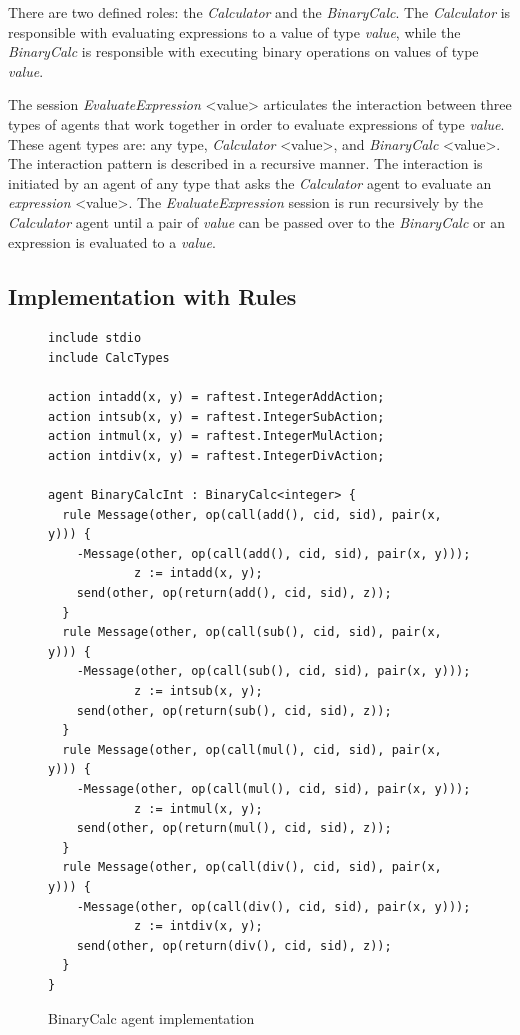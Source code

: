 \documentclass[a4paper,12pt,oneside,fleqn]{book} %
\begin{document}
{There are two defined roles: the \textit{Calculator} and the
\textit{BinaryCalc}. The \textit{Calculator} is responsible with evaluating
expressions to a value of type \textit{value}, while the
\textit{BinaryCalc} is responsible with executing binary operations on
values of type \textit{value}.

The session \textit{EvaluateExpression} <value> articulates the interaction
between three types of agents that work together in order to evaluate
expressions of type \textit{value}. These agent types are: any type,
\textit{Calculator} <value>, and \textit{BinaryCalc} <value>. The
interaction pattern is described in a recursive manner. The interaction is
initiated by an agent of any type that asks the \textit{Calculator} agent
to evaluate an \textit{expression} <value>. The \textit{EvaluateExpression}
session is run recursively by the \textit{Calculator} agent until a pair of
\textit{value} can be passed over to the \textit{BinaryCalc} or an
expression is evaluated to a \textit{value}.
\subsection{Implementation with Rules} %
\begin{figure}\footnotesize %
\begin{verbatim}
include stdio
include CalcTypes

action intadd(x, y) = raftest.IntegerAddAction;
action intsub(x, y) = raftest.IntegerSubAction;
action intmul(x, y) = raftest.IntegerMulAction;
action intdiv(x, y) = raftest.IntegerDivAction;

agent BinaryCalcInt : BinaryCalc<integer> {
  rule Message(other, op(call(add(), cid, sid), pair(x, y))) {
    -Message(other, op(call(add(), cid, sid), pair(x, y)));
            z := intadd(x, y);
    send(other, op(return(add(), cid, sid), z));
  }
  rule Message(other, op(call(sub(), cid, sid), pair(x, y))) {
    -Message(other, op(call(sub(), cid, sid), pair(x, y)));
            z := intsub(x, y);
    send(other, op(return(sub(), cid, sid), z));
  }
  rule Message(other, op(call(mul(), cid, sid), pair(x, y))) {
    -Message(other, op(call(mul(), cid, sid), pair(x, y)));
            z := intmul(x, y);
    send(other, op(return(mul(), cid, sid), z));
  }
  rule Message(other, op(call(div(), cid, sid), pair(x, y))) {
    -Message(other, op(call(div(), cid, sid), pair(x, y)));
            z := intdiv(x, y);
    send(other, op(return(div(), cid, sid), z));
  }
}
\end{verbatim}
\caption{BinaryCalc agent implementation}
\label{fig:bcalc-rules}
\end{figure} %

}
\end{document}
